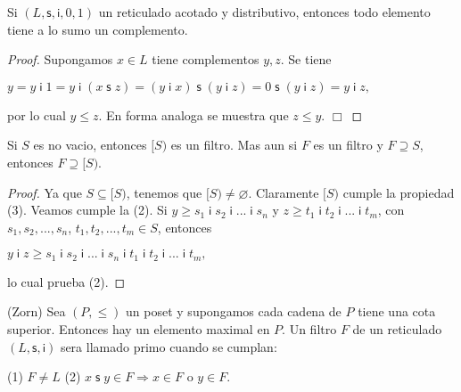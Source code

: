   \begin{lemma}
    Si \((L,\mathsf{s},\mathsf{i},0,1)\) un reticulado acotado y distributivo, entonces todo elemento tiene a lo sumo un complemento.
  \end{lemma}
  \begin{proof}
    Supongamos \(x\in L\) tiene complementos \(y,z\). Se tiene

    \(\displaystyle y=y\;\mathsf{i\;}1=y\;\mathsf{i\;}(x\;\mathsf{s\;}z)=(y\;\mathsf{i\;}x)\; \mathsf{s\;}(y\;\mathsf{i\;}z)=0\;\mathsf{s\;}(y\;\mathsf{i\;}z)=y\;\mathsf{ i\;}z, \)

    por lo cual \(y\leq z\). En forma analoga se muestra que \(z\leq y\). \(\Box\)
  \end{proof}

  \begin{lemma}
    Si \(S\) es no vacio, entonces \([S)\) es un filtro. Mas aun si \(F\) es un filtro y \(F\supseteq S\), entonces \(F\supseteq \lbrack S)\).
  \end{lemma}
  \begin{proof}
    Ya que \(S\subseteq \lbrack S)\), tenemos que \([S)\neq \varnothing \). Claramente \([S)\) cumple la propiedad (3). Veamos cumple la (2). Si \(y\geq s_{1}\; \mathsf{i\;}s_{2}\;\mathsf{i\;}...\;\mathsf{i\;}s_{n}\) y \(z\geq t_{1}\; \mathsf{i\;}t_{2}\;\mathsf{i\;}\)...\(\;\mathsf{i\;}t_{m}\), con \( s_{1},s_{2},...,s_{n}\), \(t_{1},t_{2},...,t_{m}\in S\), entonces

    \(\displaystyle y\;\mathsf{i\;}z\geq s_{1}\;\mathsf{i\;}s_{2}\;\mathsf{i\;}...\;\mathsf{i\;} s_{n}\;\mathsf{i\;}t_{1}\;\mathsf{i\;}t_{2}\;\mathsf{i\;}...\;\mathsf{i\;} t_{m}, \)

    lo cual prueba (2).
  \end{proof}

  \begin{lemma}
    (Zorn) Sea \((P,\leq )\) un poset y supongamos cada cadena de \(P\) tiene una cota superior. Entonces hay un elemento maximal en \(P\).
    Un filtro \(F\) de un reticulado \((L,\mathsf{s},\mathsf{i})\) sera llamado primo cuando se cumplan:

    (1) \(F\neq L\)
    (2) \(x\;\mathsf{s\;}y\in F\Rightarrow x\in F\) o \(y\in F\).
  \end{lemma}

